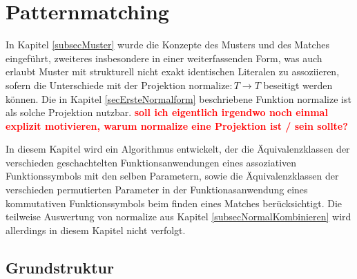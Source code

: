 \documentclass{scrartcl}
\numberwithin{figure}{section} %
\theoremstyle{definition} %
\newcommand{\BFred}[1]{\textbf{\textcolor{red}{#1}}}
\begin{document}

\section{Patternmatching} \label{secPattermatching}

In Kapitel \ref{subsecMuster} wurde die Konzepte des Musters und des Matches eingeführt, zweiteres insbesondere in einer weiterfassenden Form, was auch erlaubt Muster mit strukturell nicht exakt identischen Literalen zu assoziieren, sofern die Unterschiede mit der Projektion $\mathrm{normalize} \colon T \rightarrow T$ beseitigt werden können. Die in Kapitel \ref{secErsteNormalform} beschriebene Funktion $\mathrm{normalize}$ ist als solche Projektion nutzbar. \BFred{soll ich eigentlich irgendwo noch einmal explizit motivieren, warum normalize eine Projektion ist / sein sollte?} 

In diesem Kapitel wird ein Algorithmus entwickelt, der die Äquivalenzklassen der verschieden geschachtelten Funktionsanwendungen eines assoziativen Funktionssymbols mit den selben Parametern, sowie die Äquivalenzklassen der verschieden permutierten Parameter in der Funktionasanwendung eines kommutativen Funktionssymbols beim finden eines Matches berücksichtigt. Die teilweise Auswertung von $\mathrm{normalize}$ aus Kapitel \ref{subsecNormalKombinieren} wird allerdings in diesem Kapitel nicht verfolgt.

\subsection{Grundstruktur} \label{subsecPatternmatchingGrundstruktur}

\begin{algorithm}
\DontPrintSemicolon
\caption{$\mathrm{matchAlgorithmShell} \colon M \times T \rightarrow (B, X \rightharpoonup T)$}\label{matchAlgorithmShell}
\end{algorithm}
\end{document}
